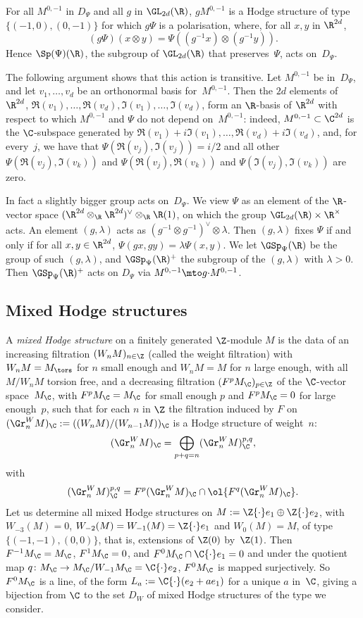 For all $M^{0,-1}$ in $D_\Psi$ and all $g$ in $\GL_{2d}(\R)$,
$gM^{0,-1}$ is a Hodge structure of type $\{(-1,0),(0,-1)\}$ for which
$g\Psi$ is a polarisation, where, for all $x,y$ in $\R^{2d}$,
\[
(g\Psi)(x\otimes y) = \Psi((g^{-1}x)\otimes(g^{-1}y)).
\]
Hence
$\Sp(\Psi)(\R)$, the subgroup of $\GL_{2d}(\R)$ that preserves~$\Psi$,
acts on~$D_\Psi$.

The following argument shows that this action is transitive. Let
$M^{0,-1}$ be in~$D_\Psi$, and let $v_1,\ldots,v_d$ be an orthonormal
basis for~$M^{0,-1}$. Then the $2d$ elements of~$\R^{2d}$,
$\Re(v_1),\ldots,\Re(v_d),\Im(v_1),\ldots,\Im(v_d)$, form an $\R$-basis
of $\R^{2d}$ with respect to which $M^{0,-1}$ and $\Psi$ do not depend
on~$M^{0,-1}$: indeed, $M^{0,-1}\subset\C^{2d}$ is the $\C$-subspace
generated by
$\Re(v_1)+i\Im(v_1),\ldots, \Re(v_d)+i\Im(v_d)$, and, for every~$j$, we have
that $\Psi(\Re(v_j),\Im(v_j))=i/2$ and all other $\Psi(\Re(v_j),\Im(v_k))$
and $\Psi(\Re(v_j),\Re(v_k))$ and $\Psi(\Im(v_j),\Im(v_k))$ are zero.

In fact a slightly bigger group acts on~$D_\Psi$. We view $\Psi$ as
an element of the $\R$-vector space
$(\R^{2d}\otimes_\R\R^{2d})^\vee\otimes_\R\R(1)$, on which the group
$\GL_{2d}(\R)\times\R^\times$ acts. An element $(g,\lambda)$ acts as
$(g^{-1}\otimes g^{-1})^\vee\otimes \lambda$. Then $(g,\lambda)$ fixes
$\Psi$ if and only if for all $x,y\in\R^{2d}$,
$\Psi(gx,gy)=\lambda\Psi(x,y)$. We let $\GSp_\Psi(\R)$ be the group of
such $(g,\lambda)$, and $\GSp_\Psi(\R)^+$ the subgroup of the
$(g,\lambda)$ with $\lambda>0$. Then $\GSp_\Psi(\R)^+$ acts on $D_\Psi$
via $M^{0,-1}\mto g{\cdot}M^{0,-1}$.

\subsection{Mixed Hodge structures}
\label{sec:mhs}
A \emph{mixed Hodge structure} on a finitely generated $\Z$-module $M$
is the data of an increasing filtration $(W_nM)_{n\in\Z}$ (called the
weight filtration) with $W_nM=M_\tors$ for $n$ small enough and
$W_nM=M$ for $n$ large enough, with all $M/W_nM$ torsion free, and a
decreasing filtration $(F^pM_\C)_{p\in\Z}$ of the $\C$-vector space~$M_\C$, with $F^pM_\C=M_\C$ for small enough $p$ and $F^pM_\C=0$ for
large enough~$p$, such that for each $n$ in $\Z$ the filtration
induced by $F$ on $(\Gr^W_nM)_\C:=((W_nM)/(W_{n-1}M))_\C$ is a Hodge
structure of weight~$n$:
\[
(\Gr^W_nM)_\C = \bigoplus_{p+q=n} (\Gr^W_nM)^{p,q}_\C,
\]
with
\[
(\Gr^W_nM)^{p,q}_\C = F^p(\Gr^W_nM)_\C\cap \ol{F^q (\Gr^W_nM)_\C}.
\]
Let us determine all mixed Hodge structures on
$M:=\Z{\cdot}e_1\oplus\Z{\cdot}e_2$, with $W_{-3}(M)=0$,
$W_{-2}(M)=W_{-1}(M)=\Z{\cdot}e_1$ and $W_0(M)=M$, of type
$\{(-1,-1),(0,0)\}$, that is, extensions of $\Z(0)$ by~$\Z(1)$. Then
$F^{-1}M_\C=M_\C$, $F^1M_\C=0$, and $F^0M_\C\cap\C{\cdot}e_1=0$ and
under the quotient map $q\colon M_\C\to M_\C/W_{-1}M_\C=\C{\cdot}e_2$,
$F^0M_\C$ is mapped surjectively. So $F^0M_\C$ is a line, of the form
$L_a:=\C{\cdot}(e_2+ae_1)$ for a unique $a$ in~$\C$, giving a
bijection from $\C$ to the set $D_W$ of mixed Hodge structures of the
type we consider.

